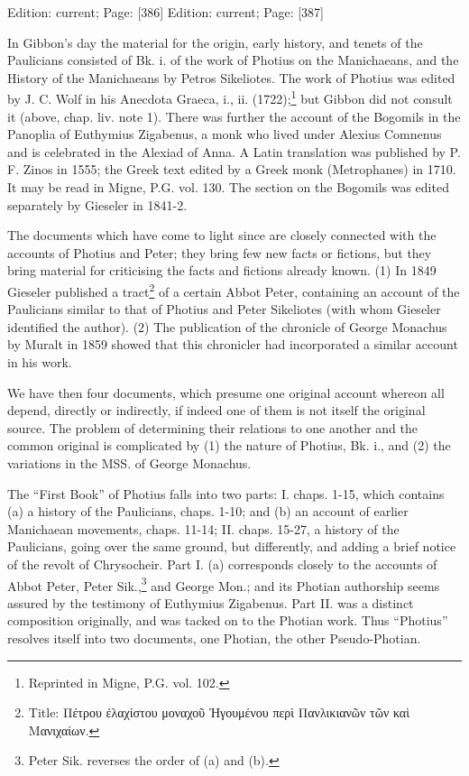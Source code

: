 Edition: current; Page: [386]
Edition: current; Page: [387]



In Gibbon\texthebrew{}’s day the material for the origin, early history, and tenets of the Paulicians consisted of Bk. i. of the work of Photius on the Manichaeans, and the History of the Manichaeans by Petros Sikeliotes. The work of Photius was edited by J. C. Wolf in his Anecdota Graeca, i., ii. (1722);\footnote{Reprinted in Migne, P.G. vol. 102.} but Gibbon did not consult it (above, chap. liv. note 1). There was further the account of the Bogomils in the Panoplia of Euthymius Zigabenus, a monk who lived under Alexius Comnenus and is celebrated in the Alexiad of Anna. A Latin translation was published by P. F. Zinos in 1555; the Greek text edited by a Greek monk (Metrophanes) in 1710. It may be read in Migne, P.G. vol. 130. The section on the Bogomils was edited separately by Gieseler in 1841-2.

The documents which have come to light since are closely connected with the accounts of Photius and Peter; they bring few new facts or fictions, but they bring material for criticising the facts and fictions already known. (1) In 1849 Gieseler published a tract\footnote{Title: \textgreek{Πέτρου \texthebrew{ἐ}λαχίστου μοναχο\texthebrew{ῦ Ἡ}γουμένου περ\texthebrew{ὶ} Πανλικιαν\texthebrew{ῶ}ν τ\texthebrew{ῶ}ν κα\texthebrew{ὶ} Μανιχαίων}.} of a certain Abbot Peter, containing an account of the Paulicians similar to that of Photius and Peter Sikeliotes (with whom Gieseler identified the author). (2) The publication of the chronicle of George Monachus by Muralt in 1859 showed that this chronicler had incorporated a similar account in his work.

We have then four documents, which presume one original account whereon all depend, directly or indirectly, if indeed one of them is not itself the original source. The problem of determining their relations to one another and the common original is complicated by (1) the nature of Photius, Bk. i., and (2) the variations in the MSS. of George Monachus.

The \texthebrew{“}First Book\texthebrew{}” of Photius falls into two parts: I. chaps. 1-15, which contains (a) a history of the Paulicians, chaps. 1-10; and (b) an account of earlier Manichaean movements, chaps. 11-14; II. chaps. 15-27, a history of the Paulicians, going over the same ground, but differently, and adding a brief notice of the revolt of Chrysocheir. Part I. (a) corresponds closely to the accounts of Abbot Peter, Peter Sik.,\footnote{Peter Sik. reverses the order of (a) and (b).} and George Mon.; and its Photian authorship seems assured by the testimony of Euthymius Zigabenus. Part II. was a distinct composition originally, and was tacked on to the Photian work. Thus \texthebrew{“}Photius\texthebrew{}” resolves itself into two documents, one Photian, the other Pseudo-Photian.

